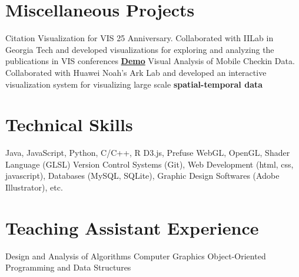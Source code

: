 \documentclass[10pt,a4paper,roman]{moderncv} %
\begin{document}



\section{Miscellaneous Projects}
 {Citation Visualization for VIS 25 Anniversary. Collaborated with IILab in Georgia Tech and developed visualizations for exploring and analyzing the publications in VIS conferences \href{http://www.cc.gatech.edu/gvu/ii/citevis/VIS25/}{\textbf{Demo}}}
 {Visual Analysis of Mobile Checkin Data. Collaborated with Huawei Noah's Ark Lab and developed an interactive visualization system for visualizing large scale \textbf{spatial-temporal data}}


\section{Technical Skills}

 {Java, JavaScript, Python, C/C++, R}
 {D3.js, Prefuse}
 {WebGL, OpenGL, Shader Language (GLSL)}
 {Version Control Systems (Git), Web Development (html, css, javascript), Databases (MySQL, SQLite), Graphic Design Softwares (Adobe Illustrator), etc.}



\section{Teaching Assistant Experience}

 {Design and Analysis of Algorithms}
 {Computer Graphics}
 {Object-Oriented Programming and Data Structures}


\end{document}
